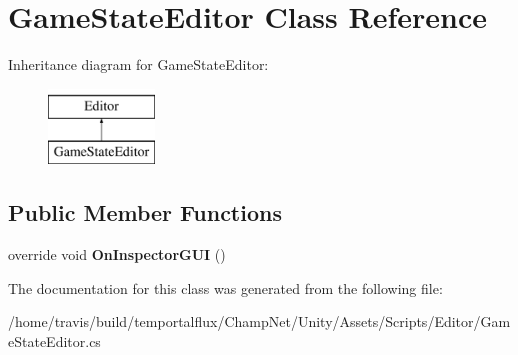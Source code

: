 \hypertarget{class_game_state_editor}{\section{Game\-State\-Editor Class Reference}
\label{class_game_state_editor}
}
Inheritance diagram for Game\-State\-Editor\-:\begin{figure}[H]
\begin{center}
\leavevmode
\includegraphics[height=2.000000cm]{class_game_state_editor}
\end{center}
\end{figure}
\subsection*{Public Member Functions}
\begin{DoxyCompactItemize}
\item 
\hypertarget{class_game_state_editor_a2fe1e0ec06ee8032b3b423c4f2451749}{override void {\bfseries On\-Inspector\-G\-U\-I} ()}\label{class_game_state_editor_a2fe1e0ec06ee8032b3b423c4f2451749}

\end{DoxyCompactItemize}


The documentation for this class was generated from the following file\-:\begin{DoxyCompactItemize}
\item 
/home/travis/build/temportalflux/\-Champ\-Net/\-Unity/\-Assets/\-Scripts/\-Editor/Game\-State\-Editor.\-cs\end{DoxyCompactItemize}
